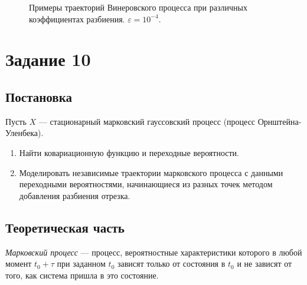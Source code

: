 \documentclass[12pt, a4paper]{article}
\begin{document}
\begin{figure}[H]
{}
\caption{Примеры траекторий Винеровского процесса при различных коэффициентах разбиения. $\varepsilon = 10^{-4}$.}
\end{figure}

\newpage
\section{Задание 10}
\subsection{Постановка}
Пусть $X$ --- стационарный марковский гауссовский процесс (процесс Орнштейна-Уленбека).
\begin{enumerate}
	\item Найти ковариационную функцию и переходные вероятности.
	\item Моделировать независимые траектории марковского процесса с данными переходными вероятностями, начинающиеся из разных точек методом добавления разбиения отрезка.
\end{enumerate}

\subsection{Теоретическая часть}
\begin{df}
\textit{Марковский процесс }--- процесс, вероятностные характеристики которого в любой момент $t_0+\tau$ при заданном $t_0$ зависят только от состояния в $t_0$ и не зависят от того, как система пришла в это состояние.
\end{df}
\end{document}
